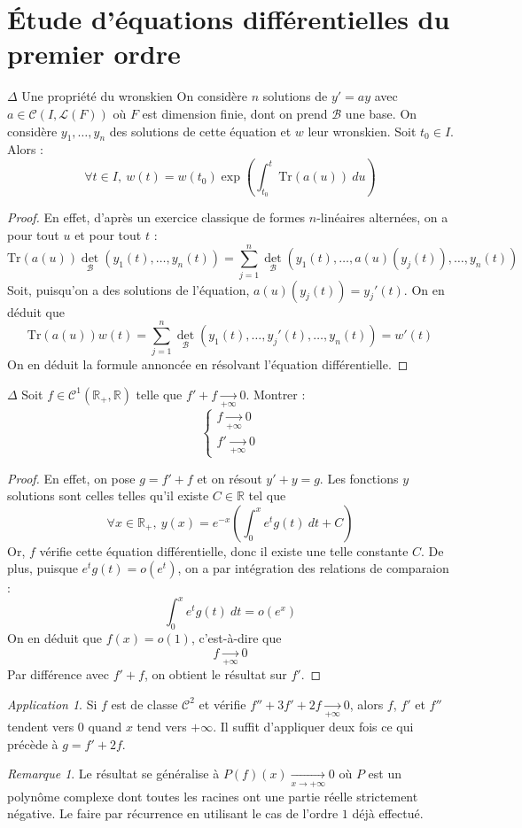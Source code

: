 \documentclass[french,a4paper]{article}
\newcommand{\R}{\mathbb{R}}
\newcommand{\Tr}{\text{Tr}}
\theoremstyle{plain}
\theoremstyle{definition}
\theoremstyle{remark}
\newtheorem*{rmq}{Remarque}
\newtheorem*{app}{Application}
\begin{document}
\section{Étude d'équations différentielles du premier ordre}

\begin{ex}[Moulin.29]{$\Delta$ Une propriété du wronskien} On considère $n$ solutions de $y'=ay$ avec $a\in \mathcal{C}(I,\mathcal{L}(F))$ où $F$ est dimension finie, dont on prend $\mathcal{B}$ une base. On considère $y_1,\ldots, y_n$ des solutions de cette équation et $w$ leur wronskien. Soit $t_0\in I$. Alors : $$\forall t\in I,\ w(t)=w(t_0)\exp\left(\int_{t_0}^{t}\Tr(a(u))\ du\right)$$
\end{ex}
\begin{proof}
	En effet, d'après un exercice classique de formes $n$-linéaires alternées, on a pour tout $u$ et pour tout $t$ : $$\Tr(a(u))\det_\mathcal{B}(y_1(t),\ldots,y_n(t))=\sum_{j=1}^{n}\det_\mathcal{B}(y_1(t),\ldots,a(u)(y_j(t)),\ldots,y_n(t))$$ Soit, puisqu'on a des solutions de l'équation, $a(u)(y_j(t))=y_j'(t)$. On en déduit que $$\Tr(a(u))w(t)=\sum_{j=1}^{n}\det_\mathcal{B}(y_1(t),\ldots,y_j'(t),\ldots,y_n(t))=w'(t)$$ On en déduit la formule annoncée en résolvant l'équation différentielle.
\end{proof}

\begin{ex}[Moulin.30]{$\Delta$}
	Soit $f\in\mathcal{C}^1(\R_+,\R)$ telle que $f'+f\xrightarrow[+\infty]{}0$. Montrer : $$\begin{cases}
		f\xrightarrow[+\infty]{}0 \\
		f'\xrightarrow[+\infty]{}0
	\end{cases}$$
\end{ex}
\begin{proof}
	En effet, on pose $g=f'+f$ et on résout $y'+y=g$. Les fonctions $y$ solutions sont celles telles qu'il existe $C\in\R$ tel que $$\forall x\in\R_+,\ y(x)=e^{-x}\left(\int_{0}^{x}e^{t}g(t)\ dt +C\right)$$ Or, $f$ vérifie cette équation différentielle, donc il existe une telle constante $C$. De plus, puisque $e^{t}g(t)=o(e^{t})$, on a par intégration des relations de comparaion : $$\int_{0}^{x}e^{t}g(t)\ dt=o(e^x)$$ On en déduit que $f(x)=o(1)$, c'est-à-dire que $$f\xrightarrow[+\infty]{}0$$ Par différence avec $f'+f$, on obtient le résultat sur $f'$.
\end{proof}
\begin{app}
	Si $f$ est de classe $\mathcal{C}^2$ et vérifie $f''+3f'+2f\xrightarrow[+\infty]{}0$, alors $f$, $f'$ et $f''$ tendent vers $0$ quand $x$ tend vers $+\infty$. Il suffit d'appliquer deux fois ce qui précède à $g=f'+2f$.
\end{app}
\begin{rmq}
	Le résultat se généralise à $P(f)(x)\xrightarrow[x\to+\infty]{}0$ où $P$ est un polynôme complexe dont toutes les racines ont une partie réelle strictement négative. Le faire par récurrence en utilisant le cas de l'ordre $1$ déjà effectué.
\end{rmq}
\end{document}
